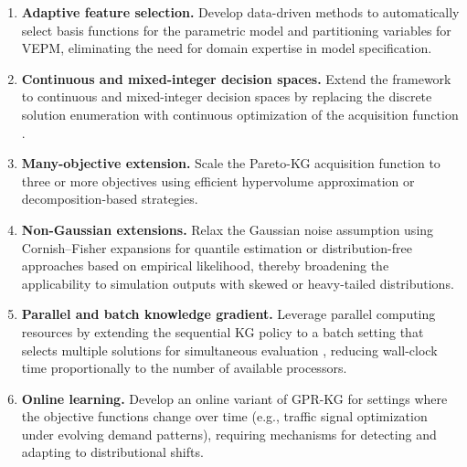 \documentclass[12pt]{article}
\theoremstyle{plain}
\theoremstyle{definition}
\theoremstyle{remark}
\begin{document}
\begin{enumerate}[label=(\arabic*),leftmargin=2.5em]
  \item \textbf{Adaptive feature selection.}  Develop data-driven methods
    to automatically select basis functions for the parametric model and
    partitioning variables for VEPM, eliminating the need for domain
    expertise in model specification.

  \item \textbf{Continuous and mixed-integer decision spaces.}  Extend
    the framework to continuous and mixed-integer decision spaces by
    replacing the discrete solution enumeration with continuous
    optimization of the acquisition function
    \citep{Scott2011,Wu2017continuous}.

  \item \textbf{Many-objective extension.}  Scale the Pareto-KG
    acquisition function to three or more objectives using efficient
    hypervolume approximation or decomposition-based strategies.

  \item \textbf{Non-Gaussian extensions.}  Relax the Gaussian noise
    assumption using Cornish--Fisher expansions for quantile estimation
    or distribution-free approaches based on empirical likelihood, thereby
    broadening the applicability to simulation outputs with skewed or
    heavy-tailed distributions.

  \item \textbf{Parallel and batch knowledge gradient.}  Leverage
    parallel computing resources by extending the sequential KG policy
    to a batch setting that selects multiple solutions for simultaneous
    evaluation \citep{Wu2016parallel}, reducing wall-clock time
    proportionally to the number of available processors.

  \item \textbf{Online learning.}  Develop an online variant of GPR-KG
    for settings where the objective functions change over time (e.g.,
    traffic signal optimization under evolving demand patterns), requiring
    mechanisms for detecting and adapting to distributional shifts.
\end{enumerate}



\newpage
\appendix
\setcounter{section}{0}
\renewcommand{\thesection}{A\arabic{section}}
\renewcommand{\theHsection}{appendix.\arabic{section}}
\setcounter{equation}{0}
\renewcommand{\theequation}{A.\arabic{equation}}
\renewcommand{\theHequation}{appendix.\arabic{equation}}
\setcounter{theorem}{0}
\renewcommand{\thetheorem}{A.\arabic{theorem}}
\renewcommand{\theHtheorem}{appendix.\arabic{theorem}}
\end{document}
